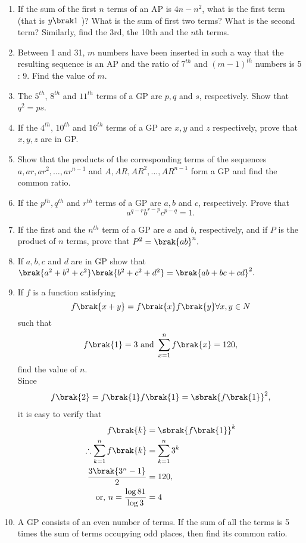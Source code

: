 \begin{enumerate}[label=\thesubsection.\arabic*, ref=\thesubsection.\theenumi]
\item If the sum of the first $n$ terms of an AP is $4n - n^2$,  what is the first term (that is $y\brak 1$ )? What
is the sum of first two terms? What is the second term? Similarly,  find the 3rd,  the 10th and
the $n$th terms.
\item Between 1 and 31,  $m$ numbers have been inserted in such a way that the resulting sequence is an AP and the ratio of $7^{th}$ and $(m - 1)^{th}$ numbers is 5 : 9. Find the value of $m$.
\item The $5^{th}$, $8^{th}$ and $11^{th}$ terms of a GP  are $p, q$ and $s$, respectively. Show that 
$q^2 = ps$.
\item If the $4^{th}$, $10^{th}$ and $16^{th}$ terms of a GP  are $x, y$ and $z$ respectively, prove that $x, y, z$ are in GP.
\item Show that the products of the corresponding terms of the sequences $a, ar, ar^2,\dots,  ar^{n-1}$ and $A, AR, AR^2,\dots,  AR^{n -1}$ form a GP  and find the common ratio.
\item If the $p^{th}, q^{th}$ and $r^{th}$ terms of a GP  are $a, b$ and $c$, respectively. Prove that 
$$a^{q-r} b^{r-p} c^{p-q} = 1.$$
\item If the first and the $n^{th}$ term of a GP  are $a$ and $b$, respectively, and if $P$ is the product of $n$ terms, prove that $P^2 = \brak{ab}^n.$
\item If $a, b, c$ and $d$ are in GP  show that $\brak{a^2 + b^2 + c^2}\brak{b^2 + c^2 + d^2} = \brak{ab + bc + cd}^2.$
\item If $f$ is a function satisfying $$f\brak{x +y} = f\brak{x} f\brak{y} \forall x,y \in N$$ such that 
	$$f\brak{1} = 3\text{ and }\sum_{x = 1}^n f\brak{x} = 120,$$ find the value of $n$.
	\\
	\solution Since 
\begin{align}
	f\brak{2}=
	f\brak{1}
	f\brak{1}
	=
	\sbrak{f\brak{1}}^2,
\end{align}
it is easy to verify that
\begin{align}
	f\brak{k}&=
	\sbrak{f\brak{1}}^k
	\\
	\therefore
\sum_{k = 1}^n f\brak{k} 
&=
\sum_{k = 1}^n 3^{k} 
	\\
	\frac{3\brak{3^{n}-1}}{2} &= 120,
	\\
	\text{or, }
	n =\frac{\log 81}{\log 3} &= 4
\end{align}
\item A GP  consists of an even number of terms. If the sum of all the terms is 5 times the sum of terms occupying odd places, then find its common ratio.

\end{enumerate}
